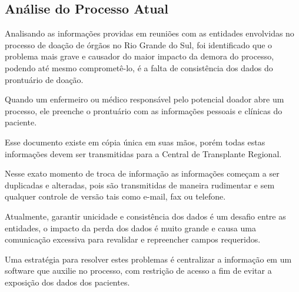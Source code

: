 \documentclass[portuguese,oneside]{tcc}
\begin{document}







\subsection{Análise do Processo Atual} \label{tab:detalhamento-problema}
Analisando as informações providas em reuniões com as entidades envolvidas no processo de doação de órgãos no Rio Grande do Sul, foi identificado que o problema mais grave e causador do maior impacto da demora do processo, podendo até mesmo comprometê-lo, é a falta de consistência dos dados do prontuário de doação. 

Quando um enfermeiro ou médico responsável pelo potencial doador abre um processo, ele preenche o prontuário com as informações pessoais e clínicas do paciente. 

Esse documento existe em cópia única em suas mãos, porém todas estas informações devem ser transmitidas para a Central de Transplante Regional.

Nesse exato momento de troca de informação as informações começam a ser duplicadas e alteradas, pois são transmitidas de maneira rudimentar e sem qualquer controle de versão tais como e-mail, fax ou telefone.

Atualmente, garantir unicidade e consistência dos dados é um desafio entre as entidades, o impacto da perda dos dados é muito grande e causa uma comunicação excessiva para revalidar e repreencher campos requeridos. 

Uma estratégia para resolver estes problemas é centralizar a informação em um software que auxilie no processo, com restrição de acesso a fim de evitar a exposição dos dados dos pacientes.
\end{document}
